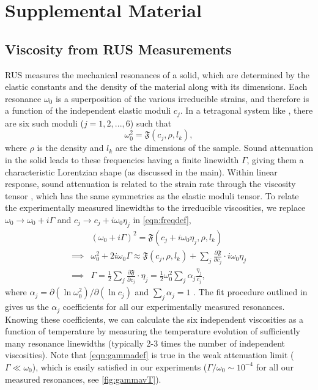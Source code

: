 \section*{Supplemental Material}
	
	\subsection*{Viscosity from RUS Measurements}
	
	RUS measures the mechanical resonances of a solid, which are determined by the elastic constants and the density of the material along with its dimensions. Each resonance $\omega_0$ is a superposition of the various irreducible strains, and therefore is a function of the independent elastic moduli $c_j$. In a tetragonal system like \sro, there are six such moduli ($j=1,2,...,6$) such that
	\begin{equation}
	\omega_0^2=\mathfrak{F}(c_j,\rho,l_k),
	\label{eqn:freqdef}
	\end{equation}
	where $\rho$ is the density and $l_k$ are the dimensions of the sample. Sound attenuation in the solid leads to these frequencies having a finite linewidth $\Gamma$, giving them a characteristic Lorentzian shape (as discussed in the main). Within linear response, sound attenuation is related to the strain rate through the viscosity tensor \cite{MorenoPRB1996}, which has the same symmetries as the elastic moduli tensor. To relate the experimentally measured linewidths to the irreducible viscosities, we replace $\omega_0\rightarrow\omega_0+i\Gamma$ and $c_j\rightarrow c_j+i\omega_0\eta_j$ in \autoref{eqn:freqdef},
	\begin{equation}
	\begin{aligned}
	&(\omega_0+i\Gamma)^2=\mathfrak{F}(c_j+i\omega_0\eta_j,\rho,l_k)\\
	\implies &\omega_0^2 + 2i\omega_0\Gamma \approx \mathfrak{F}(c_j,\rho,l_k)+\sum_{j}\frac{\partial \mathfrak{F}}{\partial c_j}\cdot i\omega_0\eta_j\\
	\implies&\Gamma =\frac{1}{2}\sum_{j}\frac{\partial \mathfrak{F}}{\partial c_j}\cdot \eta_j =\frac{1}{2}\omega_0^2\sum_{j}\alpha_j \frac{\eta_j}{c_j},
	\end{aligned}
	\label{eqn:gammadef}
	\end{equation}
	where $\alpha_j=\partial(\ln \omega_0^2)/\partial(\ln c_j)$ and $\sum_{j}\alpha_j=1$ \cite{RamshawPNAS}. The fit procedure outlined in \citet{RamshawPNAS} gives us the $\alpha_j$ coefficients for all our experimentally measured resonances. Knowing these coefficients, we can calculate the six independent viscosities as a function of temperature by measuring the temperature evolution of sufficiently many resonance linewidths (typically 2-3 times the number of independent viscosities). Note that \autoref{eqn:gammadef} is true in the weak attenuation limit ($\Gamma\ll\omega_0$), which is easily satisfied in our experiments ($\Gamma/\omega_0\sim10^{-4}$ for all our measured resonances, see \autoref{fig:gammavT}).
	
